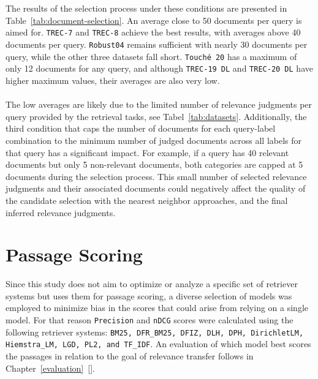 \\\\
The results of the selection process under these conditions are presented in Table~\ref{tab:document-selection}. An average close to 50 documents per query is aimed for. \texttt{TREC-7} and \texttt{TREC-8} achieve the best results, with averages above 40 documents per query. \texttt{Robust04} remains sufficient with nearly 30 documents per query, while the other three datasets fall short. \texttt{Touché 20} has a maximum of only 12 documents for any query, and although \texttt{TREC-19 DL} and \texttt{TREC-20 DL} have higher maximum values, their averages are also very low.
\\\\
The low averages are likely due to the limited number of relevance judgments per query provided by the retrieval tasks, see Tabel~\ref{tab:datasets}. Additionally, the third condition that caps the number of documents for each query-label combination to the minimum number of judged documents across all labels for that query has a significant impact. For example, if a query has 40 relevant documents but only 5 non-relevant documents, both categories are capped at 5 documents during the selection process. This small number of selected relevance judgments and their associated documents could negatively affect the quality of the candidate selection with the nearest neighbor approaches, and the final inferred relevance judgments.
\pagebreak

\section{Passage Scoring}\label{eval-passage-scoring}

Since this study does not aim to optimize or analyze a specific set of retriever systems but uses them for passage scoring, a diverse selection of models was employed to minimize bias in the scores that could arise from relying on a single model. For that reason \texttt{Precision} and \texttt{nDCG} scores were calculated using the following retriever systems: \texttt{BM25, DFR\_BM25, DFIZ, DLH, DPH, DirichletLM, Hiemstra\_LM, LGD, PL2, and TF\_IDF}. An evaluation of which model best scores the passages in relation to the goal of relevance transfer follows in Chapter~\ref{evaluation}~[].

